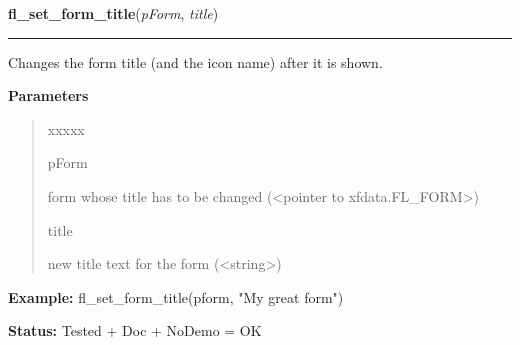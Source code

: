 \hspace{.8\funcindent}\begin{boxedminipage}{\funcwidth}

    \raggedright \textbf{fl\_set\_form\_title}(\textit{pForm}, \textit{title})

    \vspace{-1.5ex}

    \rule{\textwidth}{0.5\fboxrule}
\setlength{\parskip}{2ex}
    Changes the form title (and the icon name) after it is shown.

\setlength{\parskip}{1ex}
      \textbf{Parameters}
      \vspace{-1ex}

      \begin{quote}
        \begin{Ventry}{xxxxx}

          \item[pForm]

          form whose title has to be changed ({\textless}pointer to 
          xfdata.FL\_FORM{\textgreater})

          \item[title]

          new title text for the form ({\textless}string{\textgreater})

        \end{Ventry}

      \end{quote}

\textbf{Example:} fl\_set\_form\_title(pform, "My great form")



\textbf{Status:} Tested + Doc + NoDemo = OK



    \end{boxedminipage}

    \label{xformslib:library:fl_set_app_mainform}

    \vspace{0.5ex}

